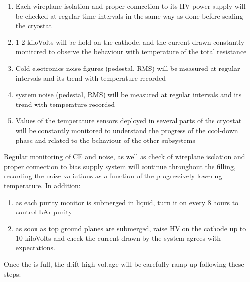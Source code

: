 \begin{enumerate}


    \item Each  wireplane isolation and proper connection to its HV power supply will be checked at regular time intervals in the same way as done before sealing the cryostat
    
    \item 1-2 kiloVolts will be hold on the cathode, and the current drawn constantly monitored to observe the behaviour with temperature of the total resistance
    
    \item Cold electronics noise figures (pedestal, RMS) will be measured at regular intervals and its trend with temperature recorded
    
    \item {} system noise (pedestal, RMS) will be measured at regular intervals and its trend with temperature recorded
    
     \item Values of the temperature sensors deployed in several parts of the cryostat will be constantly monitored to understand the progress of the cool-down phase and related to the behaviour of the other  subsystems 
     
\end{enumerate}

Regular monitoring of CE and  noise, as well as check of wireplane isolation and proper connection to bias supply system will continue throughout the filling, recording the noise variations as a function of the progressively lowering temperature. In addition:

\begin{enumerate}

    \item as each purity monitor is submerged in liquid, turn it on every 8 hours to control LAr purity
    
    \item as soon as top ground planes are submerged, raise HV on the cathode up to 10 kiloVolts and check the current drawn by the system agrees with expectations.

\end{enumerate}

Once the  is full, the drift high voltage will be carefully ramp up following these steps:

